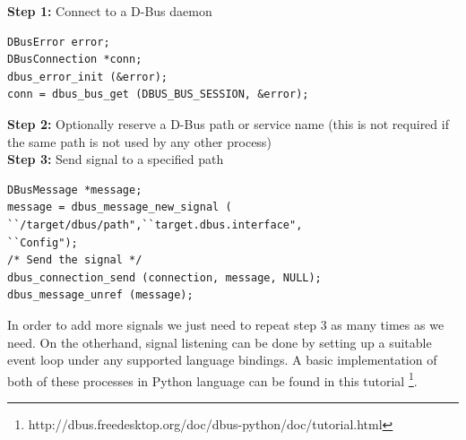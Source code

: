 \documentclass{ifacconf}
\begin{document}
\textbf{Step 1:} Connect to a D-Bus daemon
\lstset{language=C,basicstyle=\small}
\begin{lstlisting}
DBusError error;
DBusConnection *conn;
dbus_error_init (&error);
conn = dbus_bus_get (DBUS_BUS_SESSION, &error);
\end{lstlisting}
\textbf{Step 2:} Optionally reserve a D-Bus path or service name (this is not required if the same path is not used by any other process)\\
\textbf{Step 3:} Send signal to a specified path
\begin{lstlisting} 
DBusMessage *message;
message = dbus_message_new_signal (
``/target/dbus/path",``target.dbus.interface",
``Config");
/* Send the signal */
dbus_connection_send (connection, message, NULL);
dbus_message_unref (message);
\end{lstlisting}
In order to add more signals we just need to repeat step 3 as many times as we need. On the otherhand, signal listening can be done by setting up a suitable event loop under any supported language bindings. A basic implementation of both of these processes in Python language can be found in this tutorial \footnote{http://dbus.freedesktop.org/doc/dbus-python/doc/tutorial.html}. 



\end{document}
